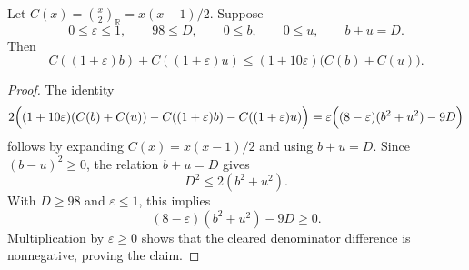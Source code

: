 \begin{helper}
Let \(C(x)=\binom{x}{2}_{\mathbb R}=x(x-1)/2\).  Suppose
\[
0\le\varepsilon\le1,\qquad 98\le D,\qquad 0\le b,\qquad 0\le u,\qquad
b+u=D.
\]
Then
\[
C((1+\varepsilon)b)+C((1+\varepsilon)u)
\le
(1+10\varepsilon)\bigl(C(b)+C(u)\bigr).
\]
\end{helper}
\begin{proof}
The identity
\[
2\Bigl((1+10\varepsilon)(C(b)+C(u))
-C((1+\varepsilon)b)-C((1+\varepsilon)u)\Bigr)
=
\varepsilon\Bigl((8-\varepsilon)(b^2+u^2)-9D\Bigr)
\]
follows by expanding \(C(x)=x(x-1)/2\) and using \(b+u=D\).  Since
\((b-u)^2\ge0\), the relation \(b+u=D\) gives
\[
D^2\le2(b^2+u^2).
\]
With \(D\ge98\) and \(\varepsilon\le1\), this implies
\[
(8-\varepsilon)(b^2+u^2)-9D\ge0.
\]
Multiplication by \(\varepsilon\ge0\) shows that the cleared denominator
difference is nonnegative, proving the claim.
\end{proof}

